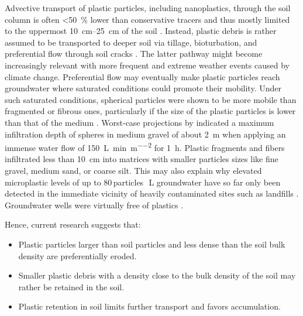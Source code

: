 Advective transport of plastic particles, including nanoplastics, through the soil column is often \SI{<50}{\percent} lower than conservative tracers and thus mostly limited to the uppermost \SIrange{10}{25}{\centi\meter} of the soil \citep{KellerTransport2020,WuTransport2020}. Instead, plastic debris is rather assumed to be transported to deeper soil via tillage, bioturbation, and preferential flow through soil cracks \citep{RilligMicroplastic2017a,YuLeaching2019,LiVertical2021}. The latter pathway might become increasingly relevant with more frequent and extreme weather events caused by climate change. Preferential flow may eventually make plastic particles reach groundwater where saturated conditions could promote their mobility. Under such saturated conditions, spherical particles were shown to be more mobile than fragmented or fibrous ones, particularly if the size of the plastic particles is lower than that of the medium \citep{WaldschlagerInfiltration2020}. Worst-case projections by \citet{WaldschlagerInfiltration2020} indicated a maximum infiltration depth of spheres in medium gravel of about \SI{2}{\meter} when applying an immense water flow of \SI{150}{\liter\per\minute\per\square\meter} for \SI{1}{\hour}. Plastic fragments and fibers infiltrated less than \SI{10}{\centi\meter} into matrices with smaller particles sizes like fine gravel, medium sand, or coarse silt.
This may also explain why elevated microplastic levels of up to \num{80}\,particles\,\si{\per\liter} groundwater have so far only been detected in the immediate vicinity of heavily contaminated sites such as landfills \citep{ManikandaBharathSpatial2021}. Groundwater wells were virtually free of plastics \citep{MintenigLow2019}.

Hence, current research suggests that:

\begin{itemize}
	\item Plastic particles larger than soil particles and less dense than the soil bulk density are preferentially eroded.
	\item Smaller plastic debris with a density close to the bulk density of the soil may rather be retained in the soil.
	\item Plastic retention in soil limits further transport and favors accumulation.
\end{itemize}

